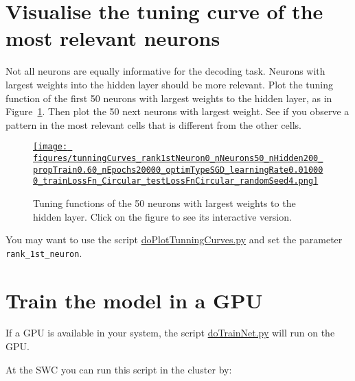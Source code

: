\documentclass[12pt]{article}
\begin{document}
\section{Visualise the tuning curve of the most relevant neurons}

Not all neurons are equally informative for the decoding task. Neurons with
largest weights into the hidden layer should be more relevant. Plot the tuning
function of the first 50 neurons with largest weights to the hidden layer, as
in Figure~\ref{fig:tunningFunctionsFirst50}. Then plot the 50 next neurons with largest weight. See if
you observe a pattern in the most relevant cells that is different from the
other cells.

\begin{figure}[H]
    \begin{center}
        \href{https://www.gatsby.ucl.ac.uk/~rapela/statNeuro/2025/worksheets/08_artificialNeuralNetworks/figures/tunningCurves_rank1stNeuron0_nNeurons50_nHidden200_propTrain0.60_nEpochs20000_optimTypeSGD_learningRate0.010000_trainLossFn_Circular_testLossFnCircular_randomSeed4.html}{\texttt{[image: figures/tunningCurves\_rank1stNeuron0\_nNeurons50\_nHidden200\_propTrain0.60\_nEpochs20000\_optimTypeSGD\_learningRate0.010000\_trainLossFn\_Circular\_testLossFnCircular\_randomSeed4.png]}}

        \caption{Tuning functions of the 50 neurons with largest weights to the
        hidden layer. Click on the figure to see its interactive version.}

        \label{fig:tunningFunctionsFirst50}
    \end{center}
\end{figure}


You may want to use the script
\href{https://github.com/joacorapela/statNeuro2025/blob/master/worksheets/08_artificialNeuralNetworks/code/scripts/doPlotTunningCurves.py}{doPlotTunningCurves.py}
and set the parameter \texttt{rank\_1st\_neuron}.

\section{Train the model in a GPU}

If a GPU is available in your system, the script
\href{https://github.com/joacorapela/statNeuro2025/blob/master/worksheets/08_artificialNeuralNetworks/code/scripts/doTrainNet.py}{doTrainNet.py}
will run on the GPU.

At the SWC you can run this script in the cluster by:
\end{document}

